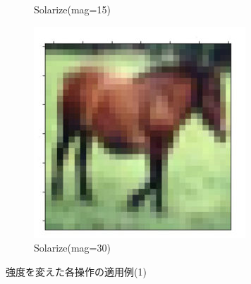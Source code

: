 \documentclass[onecolumn]{ujarticle}   %
\begin{document}
\begin{figure}[h]
\begin{subfigure}{0.3\columnwidth}
        \caption{Solarize(mag=15)}
        \label{fig:Solarize_15}
      \end{subfigure}
      \begin{subfigure}{0.3\columnwidth}
        \centering
        \includegraphics[width=1.0\columnwidth]{transform_test/Solarize_30.png}
        \caption{Solarize(mag=30)}
        \label{fig:Solarize_30}
      \end{subfigure}

      \caption{強度を変えた各操作の適用例(1)}
      \label{fig:OperationsWithVariousMagnitude1}
    \end{figure}
\end{document}

